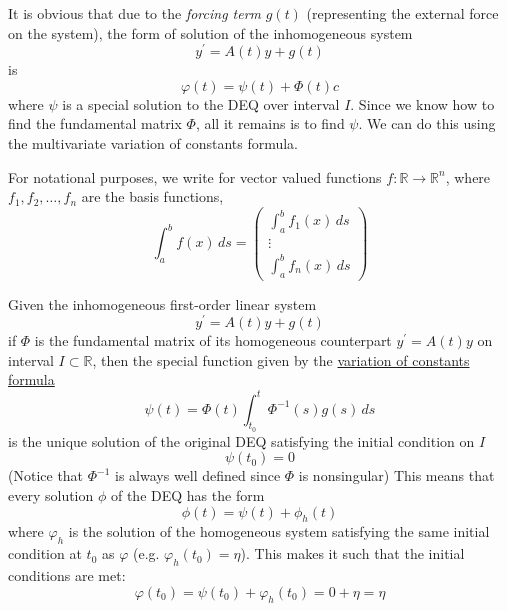 \documentclass{article}
\newcounter{theorem}[section]
\begin{document}
      It is obvious that due to the \textit{forcing term} $g(t)$ (representing the external force on the system), the form of solution of the inhomogeneous system 
      \begin{equation}
        y^\prime = A(t) y + g(t)
      \end{equation}
      is 
      \begin{equation}
        \varphi(t) = \psi(t) + \Phi(t) c
      \end{equation}
      where $\psi$ is a special solution to the DEQ over interval $I$. Since we know how to find the fundamental matrix $\Phi$, all it remains is to find $\psi$. We can do this using the multivariate variation of constants formula. 

      For notational purposes, we write for vector valued functions $f: \mathbb{R} \to \mathbb{R}^n$, where $f_1, f_2, \ldots, f_n$ are the basis functions, 
      \begin{equation}
        \int_a^b f(x)\,ds = \begin{pmatrix}
              \int_a^b f_1 (x)\,ds \\ \vdots \\ \int_a^b f_n(x)\,ds
              \end{pmatrix}
      \end{equation}

      \begin{theorem}
        \label{thm:multivariate-variation-of-constants-formula}
      Given the inhomogeneous first-order linear system 
      \begin{equation}
        y^\prime = A(t) y + g(t)
      \end{equation}
      if $\Phi$ is the fundamental matrix of its homogeneous counterpart $y^\prime = A(t) y$ on interval $I \subset \mathbb{R}$, then the special function given by the \hyperref[thm:variation-of-constants-formula]{variation of constants formula} 
      \begin{equation}
        \psi (t) = \Phi (t) \int_{t_0}^t \Phi^{-1} (s) g(s) \,ds
      \end{equation}
      is the unique solution of the original DEQ satisfying the initial condition on $I$
      \begin{equation}
        \psi (t_0) = 0
      \end{equation}
      (Notice that $\Phi^{-1}$ is always well defined since $\Phi$ is nonsingular) This means that every solution $\phi$ of the DEQ has the form 
      \begin{equation}
        \phi(t) = \psi (t) + \phi_h (t)
      \end{equation}
      where $\varphi_h$ is the solution of the homogeneous system satisfying the same initial condition at $t_0$ as $\varphi$ (e.g. $\varphi_h (t_0) = \eta$). This makes it such that the initial conditions are met: 
      \begin{equation}
        \varphi(t_0) = \psi(t_0) + \varphi_h (t_0) = 0 + \eta = \eta
      \end{equation}
      \end{theorem}
\end{document}
